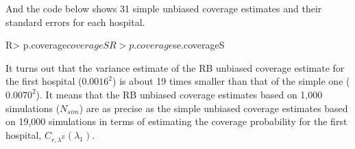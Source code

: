 \documentclass[article]{jss}
\begin{document}
And the code below shows 31 simple unbiased coverage estimates and their standard errors for each hospital.
\begin{CodeChunk}
\begin{CodeInput}
R> p.coverage$coverageS
R> p.coverage$se.coverageS
\end{CodeInput}
\end{CodeChunk}



It turns out that the variance estimate of the RB unbiased coverage estimate for the first hospital ($0.0016^2$) is about 19 times smaller than that of the simple one ($0.0070^2$). It means that the RB unbiased coverage estimates based on 1,000 simulations ($N_{sim}$) are as precise as the simple unbiased coverage estimates based on 19,000 simulations in terms of estimating the coverage probability for the first hospital, $C_{r, \lambda^E}(\lambda_1)$.
\end{document}
